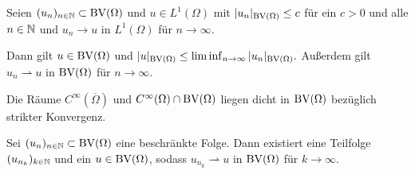 \begin{theorem}
  \label{thm:wlsc}
  Seien $(u_n)_{n\in\mathbb{N}}\subset\textup{BV}(\Omega)$ und $u\in L^1(\Omega)$ mit
  $|u_n|_{\textup{BV}(\Omega)}\leq c$ für ein $c>0$ und alle $n\in\mathbb{N}$ und
  $u_n\rightarrow u$ in $L^1(\Omega)$ für $n\rightarrow\infty$.

  Dann gilt $u\in\textup{BV}(\Omega)$ und $|u|_{\textup{BV}(\Omega)}\leq
  \liminf_{n\rightarrow\infty}|u_n|_{\textup{BV}(\Omega)}.$
  Außerdem gilt $u_n\rightharpoonup u$ in $\textup{BV}(\Omega)$ für $n\rightarrow
  \infty$.
\end{theorem}

\begin{theorem}
  \label{thm:approximationBySmoothFunctions}
  Die Räume $C^\infty(\overline\Omega)$ und $C^\infty(\Omega)\cap\textup{BV}(\Omega)$
  liegen dicht in $\textup{BV}(\Omega)$ bezüglich strikter Konvergenz.
\end{theorem}

\begin{theorem}
  \label{thm:compactness}
  Sei $(u_n)_{n\in\mathbb{N}}\subset \textup{BV}(\Omega)$ eine beschränkte Folge. Dann 
  existiert eine Teilfolge $(u_{n_k})_{k\in\mathbb{N}}$ und ein $u\in\textup{BV}(\Omega)$,
  sodass $u_{n_k}\rightharpoonup u$ in $\textup{BV}(\Omega)$ für $k\rightarrow\infty$.
\end{theorem}
